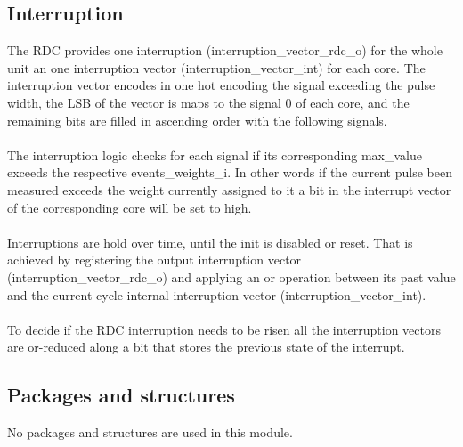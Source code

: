 \subsection{Interruption}
The RDC provides one interruption (interruption\_vector\_rdc\_o) for the whole unit an one interruption vector (interruption\_vector\_int) for each core. The interruption vector encodes in one hot encoding the signal exceeding the pulse width, the LSB of the vector is maps to the signal 0 of each core, and the remaining bits are filled in ascending order with the following signals.\\
\\
The interruption logic checks for each signal if its corresponding  max\_value exceeds the respective events\_weights\_i. In other words if the current pulse been measured exceeds the weight currently assigned to it a bit in the interrupt vector of the corresponding core will be set to high.\\
\\
Interruptions are hold over time, until the init is disabled or reset. That is achieved by registering the output interruption vector (interruption\_vector\_rdc\_o) and applying an or operation between its past value and the current cycle internal interruption vector (interruption\_vector\_int).\\
\\
To decide if the RDC interruption needs to be risen all the interruption vectors are or-reduced along a bit that stores the previous state of the interrupt.



\subsection{Packages and structures}

No packages and structures are used in this module.

